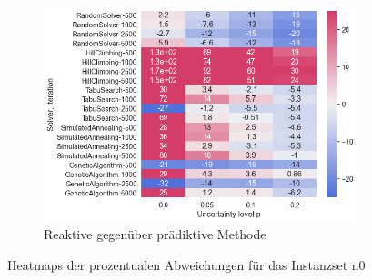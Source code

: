 \begin{figure}[H]
\begin{subfigure}{1\linewidth}
        \centering
        \includegraphics[width=0.5\linewidth]{assets/img/05_Evaluation/heatmap_n0_3.png}
        \caption{Reaktive gegenüber prädiktive Methode}
        \label{fig:evaluation_solver_n0_heatmap_3}
    \end{subfigure}
    
    \caption{Heatmaps der prozentualen Abweichungen für das Instanzset n0}
    \label{fig:evaluation_n0_heatmaps}
\end{figure}
